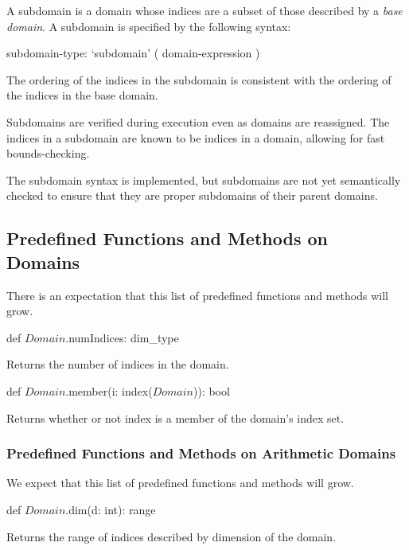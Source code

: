 A subdomain is a domain whose indices are a subset of those described
by a \emph{base domain}.  A subdomain is specified by the following
syntax:
\begin{syntax}
subdomain-type:
  `subdomain' ( domain-expression )
\end{syntax}
The ordering of the indices in the subdomain is consistent with the
ordering of the indices in the base domain.

Subdomains are verified during execution even as domains are
reassigned.  The indices in a subdomain are known to be indices in a
domain, allowing for fast bounds-checking.

\begin{status}
The subdomain syntax is implemented, but subdomains are not yet
semantically checked to ensure that they are proper subdomains
of their parent domains.
\end{status}


\subsection{Predefined Functions and Methods on Domains}

There is an expectation that this list of predefined functions and
methods will grow.

\begin{protohead}
def $Domain$.numIndices: dim_type
\end{protohead}
\begin{protobody}
Returns the number of indices in the domain.
\end{protobody}

\begin{protohead}
def $Domain$.member(i: index($Domain$)): bool
\end{protohead}
\begin{protobody}
Returns whether or not index  is a member of the domain's
index set.
\end{protobody}

\subsubsection{Predefined Functions and Methods on Arithmetic Domains}

We expect that this list of predefined functions and methods will
grow.

\begin{protohead}
def $Domain$.dim(d: int): range
\end{protohead}
\begin{protobody}
Returns the range of indices described by dimension  of the
domain.
\end{protobody}

